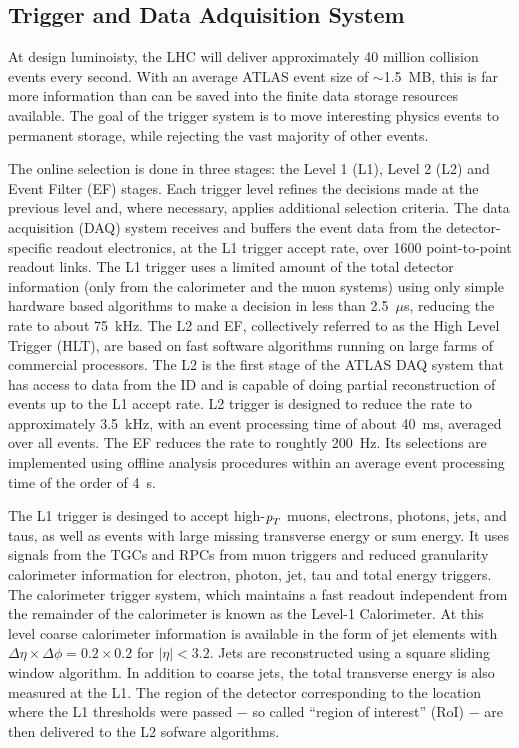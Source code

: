 \subsection{Trigger and Data Adquisition System}\label{sec:TDAQ}



At design luminoisty, the LHC will deliver approximately 40 million collision events every second. With an average ATLAS event size of $\sim$1.5~MB, this is far more information than can be saved into the finite data storage resources available. The goal of the trigger system is to move interesting physics events to permanent storage, while rejecting the vast majority of other events.

The online selection is done in three stages: the Level 1 (L1), Level 2 (L2) and Event Filter (EF) stages.  Each trigger level refines the decisions made at the previous level and, where necessary, applies additional selection criteria. The data acquisition (DAQ) system  receives and buffers the event data from the detector-specific readout electronics, at the L1 trigger accept rate, over 1600 point-to-point readout links. The L1 trigger uses a limited amount of the total detector information (only from the calorimeter and the muon systems) using only simple hardware based algorithms to make a decision in less than 2.5~$\mu$s, reducing the rate to about 75~kHz. The L2 and EF, collectively referred to as the High Level Trigger (HLT), are based on fast software algorithms running on large farms of commercial processors.  The L2 is the first stage of the ATLAS DAQ system that has access to data from the ID and is capable of doing partial reconstruction of events up to the L1 accept rate. L2 trigger is designed to reduce the rate to approximately 3.5~kHz, with an event processing time of about 40~ms, averaged over all events. The EF reduces the rate to roughtly 200~Hz. Its selections are implemented  using offline analysis procedures within an average event processing time of the order of 4~s.

The L1 trigger is desinged to accept high-${\emph{p}_{T}}$ muons, electrons, photons, jets, and taus, as well as events with large missing transverse energy or sum energy. It uses signals from the TGCs and RPCs from muon triggers and reduced granularity calorimeter information for electron, photon, jet, tau and total energy triggers. The calorimeter trigger system, which maintains a fast readout independent from the remainder of the calorimeter is known as the Level-1 Calorimeter. %
At this level coarse calorimeter information is available in the form of jet elements with $\Delta \eta \times \Delta \phi = 0.2 \times 0.2$ for $|\eta|<3.2$. Jets are reconstructed using a square sliding window algorithm. In addition to coarse jets, the total transverse energy is also measured at the L1. 
The region of the detector corresponding to the location where the L1 thresholds were passed $-$ so called ``region of interest'' (RoI) $-$ are then delivered to the L2 sofware algorithms.

